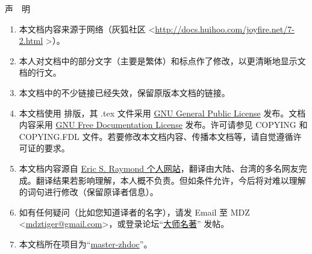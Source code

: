 \centerline{\LARGE 声\,\,\,\,\,\,明}

\baselineskip

\large
\begin{enumerate}
\item 本文档内容来源于网络（灰狐社区 <\url{http://docs.huihoo.com/joyfire.net/7-2.html} >）。
\item 本人对文档中的部分文字（主要是繁体）和标点作了修改，以更清晰地显示文档的行文。
\item 本文档中的不少链接已经失效，保留原版本文档的链接。
\item 本文档使用 \XeLaTeX{} 排版，其 .tex 文件采用 \href{http://www.gnu.org/copyleft/gpl.html}{GNU General Public License} 发布。文档内容采用 \href{http://www.gnu.org/copyleft/fdl.html}{GNU Free Documentation License} 发布。许可请参见 COPYING 和 COPYING.FDL 文件。若要修改本文档内容、传播本文档等，请自觉遵循许可证的要求。
\item 本文档内容源自 \href{http://www.catb.org/~esr/}{Eric S. Raymond 个人网站}，翻译由大陆、台湾的多名网友完成。翻译结果若影响理解，本人概不负责。但如条件允许，今后将对难以理解的词句进行修改（保留原译者信息）。
\item 如有任何疑问（比如您知道译者的名字），请发 Email 至 MDZ <\href{mailto:mdztiger@gmail.com}{mdztiger@gmail.com}>，或登录论坛“\href{http://groups.google.com/group/master-zhdoc?hl=zh-CN}{大师名著}” 发帖。
\item 本文档所在项目为“\href{http://code.google.com/p/master-zhdoc/}{master-zhdoc}”。
\end{enumerate}

\normalsize 
